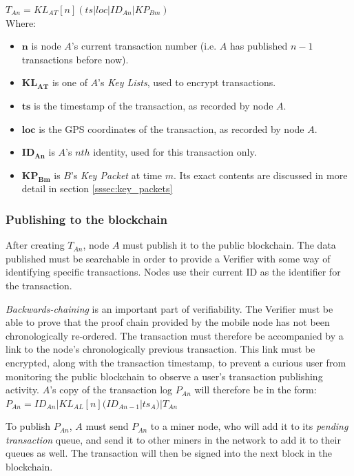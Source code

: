 \documentclass[12pt]{article}
\begin{document}
$T_{An} = KL_{AT}[n](ts|loc|ID_{An}|KP_{Bm})$
\\

Where:
\begin{itemize}[noitemsep,topsep=0pt]
	\item[] $\mathbf{n}$ is node $A$'s current transaction number (i.e. $A$ has published $n-1$ transactions before now).
	\item[] $\mathbf{KL_{AT}}$ is one of $A$'s \textit{Key Lists}, used to encrypt transactions.	
	\item[] $\mathbf{ts}$ is the timestamp of the transaction, as recorded by node $A$.
	\item[] $\mathbf{loc}$ is the GPS coordinates of the transaction, as recorded by node $A$.
	\item[] $\mathbf{ID_{An}}$ is $A$'s $nth$ identity, used for this transaction only.
	\item[] $\mathbf{KP_{Bm}}$ is $B$'s \textit{Key Packet} at time $m$. Its exact contents are discussed in more detail in section \ref{sssec:key_packets}
\end{itemize}

\subsubsection{Publishing to the blockchain}
After creating $T_{An}$, node $A$ must publish it to the public blockchain. The data published must be searchable in order to provide a Verifier with some way of identifying specific transactions. Nodes use their current ID as the identifier for the transaction.

\textit{Backwards-chaining} is an important part of verifiability. The Verifier must be able to prove that the proof chain provided by the mobile node has not been chronologically re-ordered. The transaction must therefore be accompanied by a link to the node's chronologically previous transaction. This link must be encrypted, along with the transaction timestamp, to prevent a curious user from monitoring the public blockchain to observe a user's transaction publishing activity. $A$'s copy of the transaction log $P_{An}$ will therefore be in the form:
\\

$P_{An} = ID_{An}|KL_{AL}[n](ID_{An-1}|ts_A)|T_{An}$

\null
To publish $P_{An}$, $A$ must send $P_{An}$ to a miner node, who will add it to its \textit{pending transaction} queue, and send it to other miners in the network to add it to their queues as well. The transaction will then be signed into the next block in the blockchain.
\end{document}
